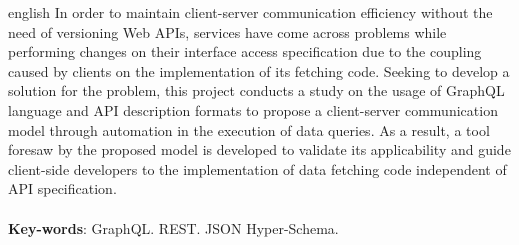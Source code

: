 \begin{resumo}[Abstract]
  \begin{otherlanguage*}{english}
    In order to maintain client-server communication efficiency without the need of versioning Web APIs, services have come across problems while performing changes on their interface access specification due to the coupling caused by clients on the implementation of its fetching code. Seeking to develop a solution for the problem, this project conducts a study on the usage of GraphQL language and API description formats to propose a client-server communication model through automation in the execution of data queries. As a result, a tool foresaw by the proposed model is developed to validate its applicability and guide client-side developers to the implementation of data fetching code independent of API specification. \\ \\
    \textbf{Key-words}: GraphQL. REST. JSON Hyper-Schema.
  \end{otherlanguage*}
\end{resumo}